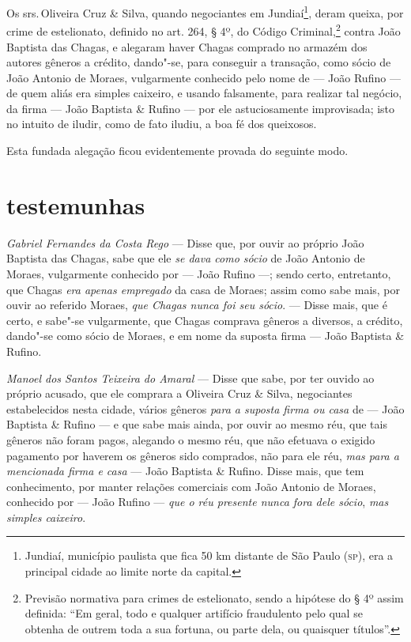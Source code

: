 \asterisc

Os srs.\,Oliveira Cruz \& Silva, quando negociantes em Jundiaí\footnote{
  Jundiaí, município paulista que fica 50 km distante de São Paulo (\textsc{sp}),
  era a principal cidade ao limite norte da capital.}, deram queixa, por
crime de estelionato, definido no art. 264, § 4º, do Código
Criminal,\footnote{Previsão normativa para crimes de estelionato,
  sendo a hipótese do § 4º assim definida: ``Em geral, todo e qualquer
  artifício fraudulento pelo qual se obtenha de outrem toda a sua
  fortuna, ou parte dela, ou quaisquer títulos''.} contra João Baptista
das Chagas, e alegaram haver Chagas comprado no armazém dos autores
gêneros a crédito, dando"-se, para conseguir a transação, como sócio de
João Antonio de Moraes, vulgarmente conhecido pelo nome de --- João
Rufino --- de quem aliás era simples caixeiro, e usando falsamente,
para realizar tal negócio, da firma --- João Baptista \& Rufino ---
por ele astuciosamente improvisada; isto no intuito de iludir, como de
fato iludiu, a boa fé dos queixosos.

Esta fundada alegação ficou evidentemente provada do seguinte modo.

\section*{testemunhas}

\noindent\emph{Gabriel Fernandes da Costa Rego} --- Disse que, por ouvir ao
próprio João Baptista das Chagas, sabe que ele \emph{se dava como sócio}
de João Antonio de Moraes, vulgarmente conhecido por --- João Rufino ---;
sendo certo, entretanto, que Chagas \emph{era apenas empregado} da casa
de Moraes; assim como sabe mais, por ouvir ao referido Moraes, \emph{que
Chagas nunca foi seu sócio}. --- Disse mais, que é certo, e sabe"-se
vulgarmente, que Chagas comprava gêneros a diversos, a crédito, dando"-se
como sócio de Moraes, e em nome da suposta firma --- João Baptista \&
Rufino.\medskip

\noindent\emph{Manoel dos Santos Teixeira do Amaral} --- Disse que sabe, por ter
ouvido ao próprio acusado, que ele comprara a Oliveira Cruz \& Silva,
negociantes estabelecidos nesta cidade, vários gêneros \emph{para a
suposta firma ou casa} de --- João Baptista \& Rufino --- e que sabe
mais ainda, por ouvir ao mesmo réu, que tais gêneros não foram pagos,
alegando o mesmo réu, que não efetuava o exigido pagamento por haverem
os gêneros sido comprados, não para ele réu, \emph{mas para a mencionada
firma e casa} --- João Baptista \& Rufino. Disse mais, que tem
conhecimento, por manter relações comerciais com João Antonio de Moraes,
conhecido por --- João Rufino --- \emph{que o réu presente nunca fora
dele sócio}, \emph{mas simples caixeiro}.\medskip

